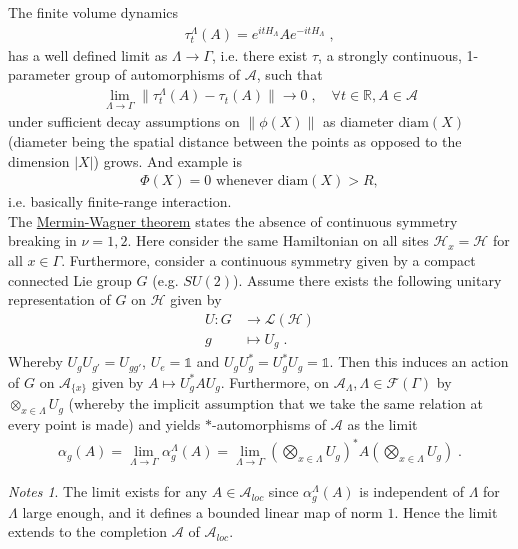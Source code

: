 \documentclass[
a4paper, %
11pt, %
onecolumn, %
openany, %
]{memoir}
\theoremstyle{definition}
\theoremstyle{remark}
\newtheorem{notes}[definition]{Notes}
\theoremstyle{plain}
\begin{document}
The finite volume dynamics \begin{align}
\tau_t^{\Lambda}(A)=e^{itH_{\Lambda}}Ae^{-itH_{\Lambda}}\; ,
\end{align}
has a well defined limit as $\Lambda\rightarrow\Gamma$, i.e. there exist $\tau$, a strongly continuous, 1-parameter group of automorphisms of $\mathcal{A}$, such that \begin{align}
\lim\limits_{\Lambda\rightarrow\Gamma}\|\tau_t^{\Lambda}(A)-\tau_t(A)\|\rightarrow 0\; , \quad \forall t\in\mathbb{R},A\in\mathcal{A}
\end{align}
under sufficient decay assumptions on $\|\phi(X)\|$ as diameter $\mathrm{diam}(X)$ (diameter being the spatial distance between the points as opposed to the dimension $|X|$) grows. And example is \begin{align}
\Phi(X)=0 \text{ whenever } \mathrm{diam}(X) > R, 
\end{align} i.e. basically finite-range interaction.\\
The \underline{Mermin-Wagner theorem} states the absence of continuous symmetry breaking in $\nu=1,2$. Here consider the same Hamiltonian on all sites $\mathcal{H}_x=\mathcal{H}$ for all $x\in\Gamma$. Furthermore, consider a continuous symmetry given by a compact connected Lie group $G$ (e.g. $SU(2)$). Assume there exists the following unitary representation of $G$ on $\mathcal{H}$ given by \begin{align}
U:G&\longrightarrow \mathcal{L}(\mathcal{H}) \\
g&\longmapsto U_g\; .
\end{align}
Whereby $U_gU_{g'}=U_{gg'}$, $U_{e}=\mathds{1}$ and $U_gU_g^*=U_g^*U_g=\mathds{1}$. Then this induces an action of $G$ on $\mathcal{A}_{\{x\}}$ given by $A\mapsto U_g^*A U_g$. Furthermore, on $\mathcal{A}_{\Lambda}, \Lambda\in\mathcal{F}(\Gamma)$ by $\otimes_{x\in\Lambda}U_g$ (whereby the implicit assumption that we take the same relation at every point is made) and yields $*$-automorphisms of $\mathcal{A}$ as the limit \begin{align}
\alpha_g(A)=\lim_{\Lambda\rightarrow\Gamma}\alpha_g^{\Lambda}(A) =\lim_{\Lambda\rightarrow\Gamma} \left(\bigotimes_{x\in\Lambda}U_g\right)^*A\left(\bigotimes_{x\in\Lambda}U_g\right)\; .
\end{align}
\begin{notes}
The limit exists for any $A\in\mathcal{A}_{loc}$ since $\alpha_g^{\Lambda}(A)$ is independent of $\Lambda$ for $\Lambda$ large enough, and it defines a bounded linear map of norm $1$. Hence the limit extends to the completion $\mathcal{A}$ of $\mathcal{A}_{loc}$.
\end{notes}
\end{document}
